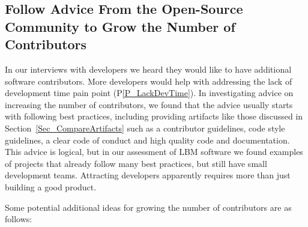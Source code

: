 \documentclass[final, 3p, times, authoryear]{elsarticle}
\newcommand{\ppref}[1]{P\ref{#1}}
\begin{document}
\subsection{Follow Advice From the Open-Source Community to Grow the Number of Contributors} \label{Sec_GrowContributors}

In our interviews with developers we heard they would like to have additional
software contributors.  More developers would help with addressing the lack of
development time pain point (\ppref{P_LackDevTime}).  In investigating advice on
increasing the number of contributors, we found that the advice usually starts
with following best practices, including providing artifacts like those
discussed in Section~\ref{Sec_CompareArtifacts} such as a contributor
guidelines, code style guidelines, a clear code of conduct and high quality code
and documentation. This advice is logical, but in our assessment of LBM software
we found examples of projects that already follow many best practices, but still
have small development teams. Attracting developers apparently requires more
than just building a good product.

Some potential additional ideas for growing the number of contributors are
as follows:
\end{document}
